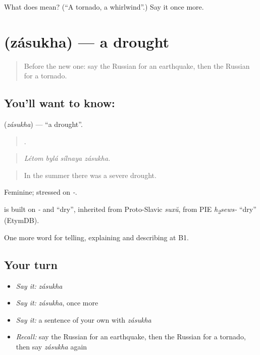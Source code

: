 \begin{tcolorbox}[breakable,colback=teal!4,colframe=teal!35!black,title={Before you move on}]
What does  mean? (\textquotedblleft{}A tornado, a whirlwind\textquotedblright{}.) Say it once more.
\end{tcolorbox}
\section[\texorpdfstring{\ru{засуха} (zásukha)}{засуха (zásukha)}]{ (zásukha) — a drought}

\label{lesson:RU-C300-zasukha}



\begin{quote}
Before the new one: say the Russian for an earthquake, then the Russian for a tornado.
\end{quote}

\subsection*{You'll want to know: }
\textbf{} (\emph{zásukha}) — \textquotedblleft{}a drought\textquotedblright{}.

\begin{quote}
   .
\end{quote}

\begin{quote}
\emph{Létom bylá sílnaya zásukha.}
\end{quote}

\begin{quote}
In the summer there was a severe drought.
\end{quote}

Feminine; stressed on \emph{-}.

\begin{cousinweb}
\emph{} is built on \emph{-} and \emph{} \textquotedblleft{}dry\textquotedblright{}, inherited from Proto-Slavic \emph{suxŭ}, from PIE \emph{h\textsubscript{2}sews-} \textquotedblleft{}dry\textquotedblright{} (EtymDB).
\end{cousinweb}

\begin{grammarlens}[title={What you've built}]
One more word for telling, explaining and describing at B1.
\end{grammarlens}

\subsection*{Your turn}
\begin{itemize}
\raggedright
  \item \emph{Say it:} \emph{zásukha}
  \item \emph{Say it:} \emph{zásukha}, once more
  \item \emph{Say it:} a sentence of your own with \emph{zásukha}
  \item \emph{Recall:} say the Russian for an earthquake, then the Russian for a tornado, then say \emph{zásukha} again
\end{itemize}

